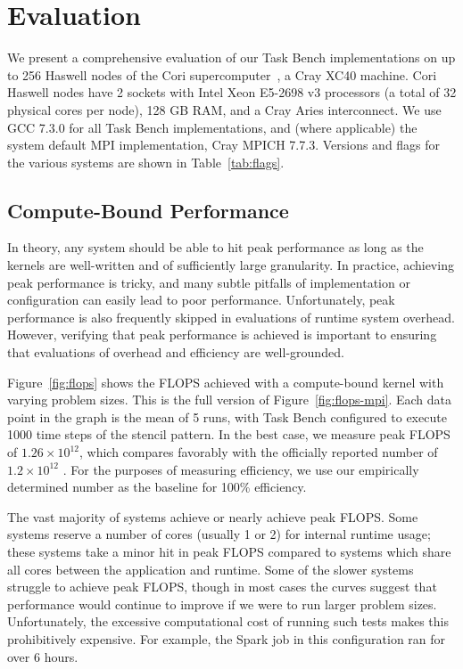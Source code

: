 \section{Evaluation}
\label{sec:evaluation}



We present a comprehensive evaluation of our Task Bench implementations on up to 256
Haswell nodes of the Cori supercomputer~\cite{Cori}, a Cray XC40
machine. Cori Haswell nodes have 2 sockets with Intel Xeon E5-2698 v3
processors (a total of 32 physical cores per node), 128 GB RAM, and a
Cray Aries interconnect. We use GCC 7.3.0 for all Task Bench
implementations, and (where applicable) the system default MPI
implementation, Cray MPICH 7.7.3. Versions and flags for the
various systems are shown in Table~\ref{tab:flags}.

\subsection{Compute-Bound Performance}
\label{subsec:peak-performance-and-efficiency}

In theory, any system should be able to hit peak performance as long as
the kernels are well-written and of sufficiently large granularity. In
practice, achieving peak performance is tricky, and many subtle pitfalls of implementation or configuration can easily lead to poor performance. Unfortunately, peak performance is also frequently skipped in evaluations of
runtime system overhead. However, verifying that peak performance is
achieved is important to ensuring that evaluations of overhead and
efficiency are well-grounded.

Figure~\ref{fig:flops} shows the FLOPS achieved with a compute-bound
kernel with varying problem sizes. This is the full version of
Figure~\ref{fig:flops-mpi}. Each data point in the graph is the mean of 5 runs, with Task Bench configured to execute 1000 time steps of the stencil pattern. In the best case, we measure peak FLOPS of
$1.26 \times 10^{12}$, which compares favorably with the officially
reported number of $1.2 \times 10^{12}$ \cite{Cori}. For the purposes
of measuring efficiency, we use our empirically determined number as
the baseline for 100\% efficiency.




The vast majority of systems achieve or nearly achieve peak FLOPS. Some
systems reserve a number of cores (usually 1 or 2) for internal
runtime usage; these systems take a minor hit in peak FLOPS compared
to systems which share all cores between the application and runtime. Some of the
slower systems struggle to achieve peak FLOPS, though in most cases
the curves suggest that performance would continue to improve if we
were to run larger problem sizes. Unfortunately, the excessive
computational cost of running such tests makes this prohibitively
expensive. For example, the Spark job in
this configuration ran for over 6 hours.

